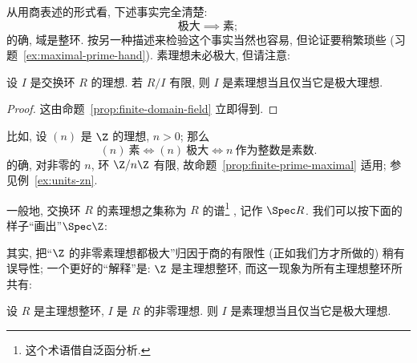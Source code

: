 从用商表述的形式看, 下述事实完全清楚:
\[
\text{极大} \implies \text{素};
\]
的确, 域是整环. 按另一种描述来检验这个事实当然也容易, 但论证要稍繁琐些 (习题~\ref{ex:maximal-prime-hand}). 素理想未必极大, 但请注意:

\begin{proposition}
\label{prop:finite-prime-maximal}
设 $I$ 是交换环 $R$ 的理想. 若 $R/I$ 有限, 则 $I$ 是素理想当且仅当它是极大理想.
\end{proposition}

\begin{proof}
这由命题~\ref{prop:finite-domain-field} 立即得到.
\end{proof}

比如, 设 $(n)$ 是 $\Z$ 的理想, $n > 0$; 那么
\[
(n) \ \text{素} \iff (n) \ \text{极大} \iff n \ \text{作为整数是素数}.
\]
的确, 对非零的 $n$, 环 $\Z/n\Z$ 有限, 故命题~\ref{prop:finite-prime-maximal} 适用; 参见例~\ref{ex:units-zn}.

一般地, 交换环 $R$ 的素理想之集称为 $R$ 的谱\footnote{这个术语借自泛函分析.}%
, 记作 $\Spec R$. 我们可以按下面的样子``画出''$\Spec \Z$:
\begin{center}
\end{center}

其实, 把``$\Z$ 的非零素理想都极大''归因于商的有限性 (正如我们方才所做的) 稍有误导性; 一个更好的``解释''是: $\Z$ 是主理想整环, 而这一现象为所有主理想整环所共有:

\begin{proposition}
\label{prop:PID-prime-maximal}
设 $R$ 是主理想整环, $I$ 是 $R$ 的非零理想. 则 $I$ 是素理想当且仅当它是极大理想.
\end{proposition}

